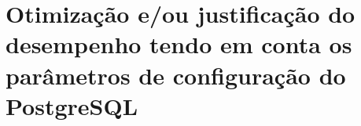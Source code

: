 \section{Otimização e/ou justificação do desempenho tendo em conta os parâmetros de configuração do PostgreSQL}
